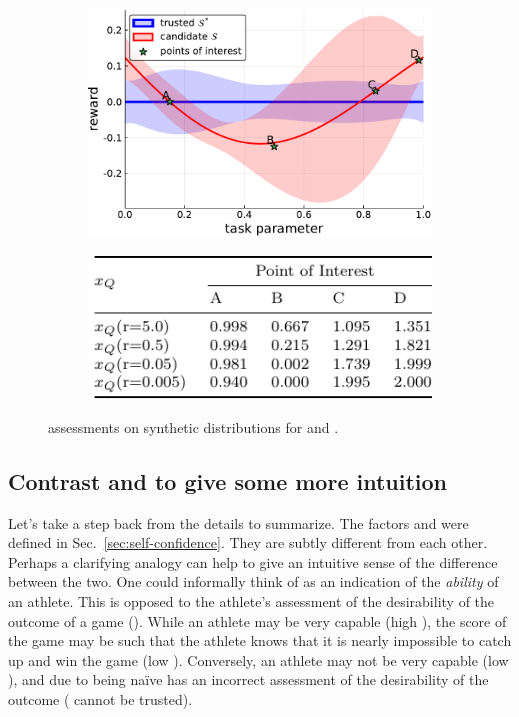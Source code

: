 \begin{figure}[tbp]
    \centering
    \begin{subfigure}[c]{0.65\linewidth}
        \centering
        \includegraphics[width=0.7\linewidth]{Figures/p1.pdf}
        \vfill
    \end{subfigure}%
    \hfill
    \begin{subfigure}[t]{0.35\linewidth}
        \centering
        \includegraphics[width=1.0\linewidth]{Figures/p1_table.pdf}
    \end{subfigure} 
    \caption{\xQ{} assessments on synthetic \pri{} distributions for \solvetrust{} and \solvecand{}.}
    \label{fig:sq_thry1}
\end{figure}

\subsection{Contrast \xQ{} and \xO{} to give some more intuition}
Let's take a step back from the details to summarize. The factors \xQ{} and \xO{} were defined in Sec.~\ref{sec:self-confidence}. They are subtly different from each other. Perhaps a clarifying analogy can help to give an intuitive sense of the difference between the two. One could informally think of \xQ{} as an indication of the \emph{ability} of an athlete. This is opposed to the athlete's assessment of the desirability of the outcome of a game (\xO). While an athlete may be very capable (high \xQ), the score of the game may be such that the athlete knows that it is nearly impossible to catch up and win the game (low \xO). Conversely, an athlete may not be very capable (low \xQ), and due to being na\"{i}ve has an incorrect assessment of the desirability of the outcome (\xO{} cannot be trusted).
